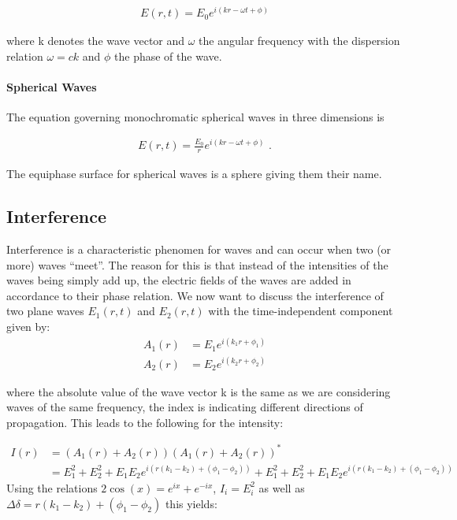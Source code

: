 \begin{align}
E\left(r, t \right) = E_0 e^{i(kr-\omega t + \phi)}
\end{align}

where k denotes the wave vector and $\omega$ the angular frequency with the dispersion relation $\omega = ck$ and $\phi$ the phase of the wave.
\paragraph{Spherical Waves}

The equation governing monochromatic spherical waves in three dimensions is

\begin{align}
E(r, t) = \frac{E_0}{r}e^{i(kr-\omega t+\phi)}\text{ .}
\end{align}

The equiphase surface for spherical waves is a sphere giving them their name.
\subsection{Interference \label{Interference}}

Interference is a characteristic phenomen for waves and can occur when two (or more) waves ``meet''. The reason for this is that instead of the intensities of the waves being simply add up, the electric fields of the waves are added in accordance to their phase relation. We now want to discuss the interference of two plane waves $E_1(r, t)$ and $E_2(r, t)$ with the time-independent component given by:
\begin{align}
A_1(r) &= E_1 e^{i(k_1r+\phi_1)}\\
A_2(r) &= E_2 e^{i(k_2r+\phi_2)}
\end{align}

where the absolute value of the wave vector k is the same as we are considering waves of the same frequency, the index is indicating different directions of propagation. This leads to the following for the intensity:

\begin{align*}
I(r )&=\left( A_1(r) + A_2(r)\right) \left( A_1(r) + A_2(r)\right) ^*\\
     &= E_1^2 + E_2^2 + E_1E_2e^{i(r(k_1-k_2)+(\phi_1-\phi_2))} +  E_1^2 + E_2^2 + E_1E_2e^{i(r(k_1-k_2)+(\phi_1-\phi_2))}
\end{align*}
Using the relations $2\cos(x) = e^{ix} + e^{-ix}$, $I_i=E_i^2$ as well as $\Delta \delta = r(k_1 - k_2) +(\phi_1-\phi_2)$ this yields:

